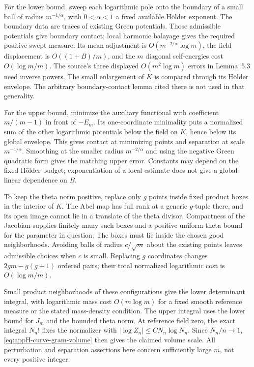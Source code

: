 For the lower bound, sweep each logarithmic pole onto the
boundary of a small ball of radius $m^{-1/\alpha}$, with
$0<\alpha<1$ a fixed available H\"older exponent. The boundary
data are traces of existing Green potentials. Those admissible
potentials give boundary contact; local harmonic balayage
gives the required positive swept measure. Its mean adjustment
is $O(m^{-2/\alpha}\log m)$, the field displacement is
$O((1+B)/m)$, and the $m$ diagonal self-energies cost
$O(\log m/m)$. The source's three displayed $O(m^2\log m)$
errors in Lemma~5.3 need inverse powers. The small enlargement
of $K$ is compared through its H\"older envelope. The arbitrary
boundary-contact lemma cited there is not used in that generality.

For the upper bound, minimize the auxiliary functional with
coefficient $m/(m-1)$ in front of $-E_m$. Its one-coordinate
minimality puts a normalized sum of the other logarithmic
potentials below the field on $K$, hence below its global
envelope. This gives contact at minimizing points and separation
at scale $m^{-1/\alpha}$. Smoothing at the smaller radius
$m^{-2/\alpha}$ and using the negative Green quadratic form
gives the matching upper error. Constants may depend on the
fixed H\"older budget; exponentiation of a local estimate
does not give a global linear dependence on $B$.

To keep the theta norm positive, replace only $g$ points inside
fixed product boxes in the interior of $K$. The Abel map has
full rank at a generic $g$-tuple there, and its open image
cannot lie in a translate of the theta divisor. Compactness
of the Jacobian supplies finitely many such boxes and a
positive uniform theta bound for the parameter in question.
The boxes must lie inside the chosen good neighborhoods.
Avoiding balls of radius $c/\sqrt m$ about the existing points
leaves admissible choices when $c$ is small. Replacing $g$
coordinates changes $2gm-g(g+1)$ ordered pairs; their total
normalized logarithmic cost is $O(\log m/m)$.

Small product neighborhoods of these configurations give
the lower determinant integral, with logarithmic mass cost
$O(m\log m)$ for a fixed smooth reference measure or the
stated mass-density condition. The upper integral uses the
lower bound for $J_m$ and the bounded theta norm. At reference
field zero, the exact integral $N_n!$ fixes the normalizer
with $|\log Z_n|\leq C N_n\log N_n$. Since $N_n/n\to1$,
\eqref{eq:appH-curve-gram-volume} then gives the claimed
volume scale. All perturbation and separation assertions
here concern sufficiently large $m$, not every positive integer.

